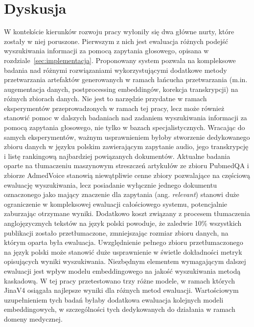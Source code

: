 \section{Dyskusja}
W kontekście kierunków rozwoju pracy wyłoniły się dwa główne nurty, które zostały w niej poruszone. Pierwszym z nich jest ewaluacja różnych podejść wyszukiwania informacji za pomocą zapytania głosowego, opisana w rozdziale~\ref{sec:implementacja}. Proponowany system pozwala na kompleksowe badania nad różnymi rozwiązaniami wykorzystującymi dodatkowe metody przetwarzania artefaktów generowanych w ramach łańcucha przetwarzania (m.in. augementacja danych, postprocessing embeddingów, korekcja transkrypcji) na różnych zbiorach danych. Nie jest to narzędzie przydatne w ramach eksperymentów przeprowadzonych w ramach tej pracy, lecz może również stanowić pomoc w dalszych badaniach nad zadaniem wyszukiwania informacji za pomocą zapytania głosowego, nie tylko w bazach specjalistycznych. Wracając do samych eksperymentów, ważnym usprawnieniem byłoby stworzenie dedykowanego zbioru danych w języku polskim zawierającym zapytanie audio, jego transkrypcję i listę rankingową najbardziej powiązanych dokumentów. Aktualne badania oparte na tłumaczeniu maszynowym streszczeń artykułów ze zbioru PubmedQA i zbiorze AdmedVoice stanowią niewątpliwie cenne zbiory pozwalające na częściową ewaluację wyszukiwania, lecz posiadanie wyłącznie jednego dokumentu oznaczonego jako mający znaczenie dla zapytania (ang. \textit{relevant}) stanowi duże ograniczenie w kompleksowej ewaluacji całościowego systemu, potencjalnie zaburzając otrzymane wyniki. Dodatkowo koszt związany z procesem tłumaczenia anglojęzycznych tekstów na język polski powoduje, że zaledwie 10\% wszystkich publikacji zostało przetłumaczone, zmniejszając rozmiar zbioru danych, na którym oparta była ewaluacja. Uwzględnienie pełnego zbioru przetłumaczonego na język polski może stanowić duże usprawnienie w świetle dokładności metryk opisujących wyniki wyszukiwania. Niezbędnym elementem wymagającym dalszej ewaluacji jest wpływ modelu embeddingowego na jakość wyszukiwania metodą kaskadową. W tej pracy przetestowano trzy różne modele, w ramach których JinaV4 osiągała najlepsze wyniki dla różnych metod ewaluacji. Wartościowym uzupełnieniem tych badań byłaby dodatkowa ewaluacja kolejnych modeli embeddingowych, w szczególności tych dedykowanych do działania w ramach domeny medycznej. \\

